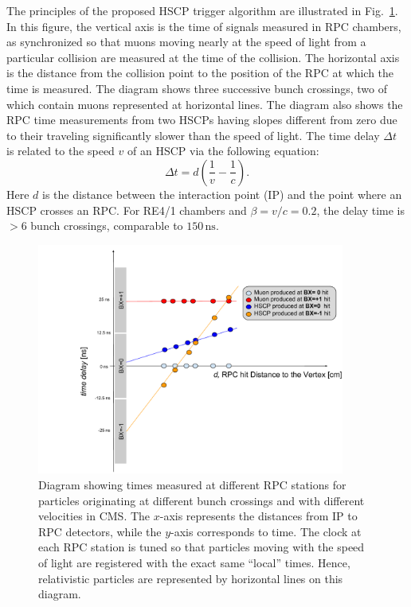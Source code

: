 The principles of the proposed HSCP trigger algorithm are illustrated in Fig.~\ref{fig:HSCP_diagram}. In this figure, the vertical axis is the time of signals measured in RPC chambers, as synchronized so that muons moving nearly at the speed of light from a particular collision are measured at the time of the collision. The horizontal axis is the distance from the collision point to the position of the RPC at which the time is measured. The diagram shows three successive bunch crossings, two of which contain muons represented at horizontal lines. The diagram also shows the RPC time measurements from two HSCPs having slopes different from zero due to their traveling significantly slower than the speed of light. The time delay $\Delta t$ is related to the speed $v$ of an HSCP via the following equation:
%
\begin{equation}
\label{eq:HSCP_delay}
\Delta t = d\left(\frac{1}{v}-\frac{1}{c}\right).
\end{equation}
%
Here $d$ is the distance between the interaction point (IP) and the point where an HSCP crosses an RPC. For RE4/1 chambers and $\beta = v/c = 0.2$, the delay time is $>6$ bunch crossings, comparable to $150 \, \mathrm{ns}$.

\begin{figure}[t]
  \centering
  \includegraphics[width=0.9\textwidth]{figures/HSCP/diagram.pdf}
  \caption{Diagram showing times measured at different RPC stations for particles originating at different bunch crossings and with different velocities in CMS. The $x$-axis represents the distances from IP to RPC detectors, while the $y$-axis corresponds to time. The clock at each RPC station is tuned so that particles moving with the speed of light are registered with the exact same ``local'' times. Hence, relativistic particles are represented by horizontal lines on this diagram.}
  \label{fig:HSCP_diagram}
\end{figure}

